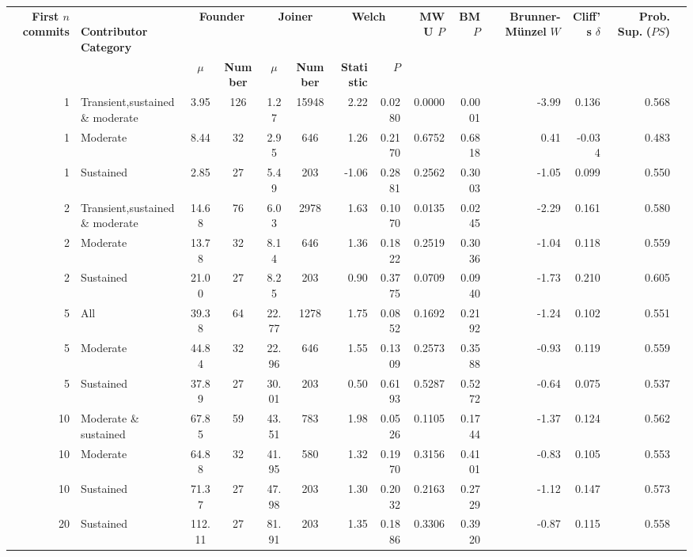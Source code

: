 \begin{landscape}
\begin{table}[H]
\begin{tabular}{r p{4cm} c c c c r r r r r r r r}
\toprule
\makecell[t]{\textbf{First $n$}\\\textbf{commits}} & \makecell[t]{\textbf{}\\\textbf{Contributor}\\\textbf{Category}} & \multicolumn{2}{c}{\textbf{Founder}} & \multicolumn{2}{c}{\textbf{Joiner}} & \multicolumn{2}{c}{\textbf{Welch}} & \textbf{MWU $P$} & \textbf{BM $P$} & \makecell[t]{\textbf{}\\\textbf{Brunner-Münzel}\\\textbf{$W$}} & \makecell[t]{\textbf{Cliff's}\\\textbf{$\delta$}} & \makecell[t]{\textbf{Prob. Sup.}\\\textbf{($PS$)}} \\ 
\cmidrule(lr){3-4} \cmidrule(lr){5-6} \cmidrule(lr){7-8}
 &  & \textbf{$\mu$} & \textbf{Number} & \textbf{$\mu$} & \textbf{Number} & \textbf{Statistic} & \textbf{$P$} &  &  &  &  &  \\ 
\midrule
1 & Transient,sustained \& moderate &  3.95 & 126 & 1.27 & 15948 & 2.22 & 0.0280 & 0.0000 & 0.0001 & -3.99 & 0.136 & 0.568 \\ 
1 & Moderate &  8.44 & 32 & 2.95 & 646 & 1.26 & 0.2170 & 0.6752 & 0.6818 & 0.41 & -0.034 & 0.483 \\ 
1 & Sustained &  2.85 & 27 & 5.49 & 203 & -1.06 & 0.2881 & 0.2562 & 0.3003 & -1.05 & 0.099 & 0.550 \\ 
2 & Transient,sustained \& moderate &  14.68 & 76 & 6.03 & 2978 & 1.63 & 0.1070 & 0.0135 & 0.0245 & -2.29 & 0.161 & 0.580 \\ 
2 & Moderate &  13.78 & 32 & 8.14 & 646 & 1.36 & 0.1822 & 0.2519 & 0.3036 & -1.04 & 0.118 & 0.559 \\ 
2 & Sustained &  21.00 & 27 & 8.25 & 203 & 0.90 & 0.3775 & 0.0709 & 0.0940 & -1.73 & 0.210 & 0.605 \\ 
5 & All &  39.38 & 64 & 22.77 & 1278 & 1.75 & 0.0852 & 0.1692 & 0.2192 & -1.24 & 0.102 & 0.551 \\ 
5 & Moderate &  44.84 & 32 & 22.96 & 646 & 1.55 & 0.1309 & 0.2573 & 0.3588 & -0.93 & 0.119 & 0.559 \\ 
5 & Sustained &  37.89 & 27 & 30.01 & 203 & 0.50 & 0.6193 & 0.5287 & 0.5272 & -0.64 & 0.075 & 0.537 \\ 
10 & Moderate \& sustained &  67.85 & 59 & 43.51 & 783 & 1.98 & 0.0526 & 0.1105 & 0.1744 & -1.37 & 0.124 & 0.562 \\ 
10 & Moderate &  64.88 & 32 & 41.95 & 580 & 1.32 & 0.1970 & 0.3156 & 0.4101 & -0.83 & 0.105 & 0.553 \\ 
10 & Sustained &  71.37 & 27 & 47.98 & 203 & 1.30 & 0.2032 & 0.2163 & 0.2729 & -1.12 & 0.147 & 0.573 \\ 
20 & Sustained &  112.11 & 27 & 81.91 & 203 & 1.35 & 0.1886 & 0.3306 & 0.3920 & -0.87 & 0.115 & 0.558 \\ 
\bottomrule
\end{tabular}%
\label{tab:codebase_graph_latex_repository_graph_component_time_series_statistical_significance_test_classes_previous} 
\end{table}
\end{landscape}
\newpage 
